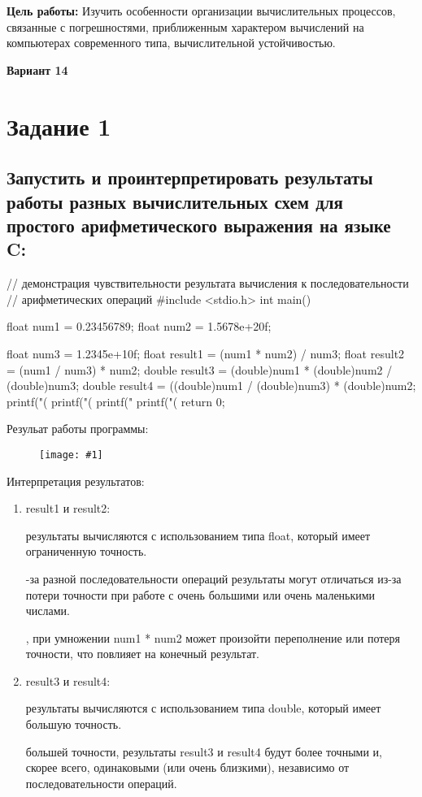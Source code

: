 \documentclass{report}
\newcommand{\drawzalupa}[2]{
	\begin{figure}[H]
		\centering
		\texttt{[image: \#1]}
	\end{figure}
}
\begin{document}
	\textbf{Цель работы:} Изучить особенности организации вычислительных процессов, связанные с
	погрешностями, приближенным характером вычислений на компьютерах современного типа,
	вычислительной устойчивостью.
	\begin{center}
		\textbf{Вариант 14}
	\end{center}
	\bigbreak
	\tableofcontents
	
	\chapter{Задание 1}
	\section{Запустить и проинтерпретировать результаты работы разных вычислительных схем для
		простого арифметического выражения на языке C:}
	
	\begin{code}
// демонстрация чувствительности результата вычисления к последовательности
// арифметических операций
#include <stdio.h>
int main() {
	float num1 = 0.23456789;
	float num2 = 1.5678e+20f;
	
	float num3 = 1.2345e+10f;
	float result1 = (num1 * num2) / num3;
	float result2 = (num1 / num3) * num2;
	double result3 = (double)num1 * (double)num2 / (double)num3;
	double result4 = ((double)num1 / (double)num3) * (double)num2;
	printf("(%
	printf("(%
	printf("%
	printf("(%
	return 0;
}
	\end{code}
	
	Резульат работы программы:
	\drawzalupa{images/task1.png}{0.8}
	
	Интерпретация результатов:
	\begin{enumerate}
	\item{result1 и result2:}
	
	\begin{itemize}
	 результаты вычисляются с использованием типа float, который имеет ограниченную точность.
	
	-за разной последовательности операций результаты могут отличаться из-за потери точности при работе с очень большими или очень маленькими числами.
	
	, при умножении num1 * num2 может произойти переполнение или потеря точности, что повлияет на конечный результат.
	\end{itemize}
	
	\item{result3 и result4:}
	
	\begin{itemize}
	 результаты вычисляются с использованием типа double, который имеет большую точность.
	
	 большей точности, результаты result3 и result4 будут более точными и, скорее всего, одинаковыми (или очень близкими), независимо от последовательности операций.
	\end{itemize}
	\end{enumerate}
\end{document}
